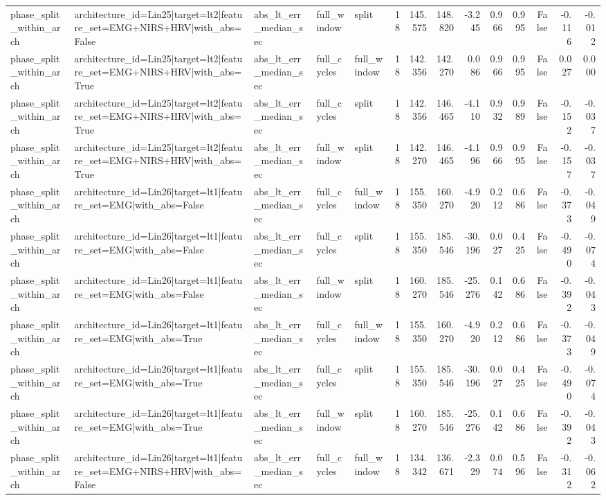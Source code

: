\begin{table}
\begin{tabular}{lllllrrrrrrrrr}
phase_split_within_arch & architecture_id=Lin25|target=lt2|feature_set=EMG+NIRS+HRV|with_abs=False & abs_lt_err_median_sec & full_window & split & 18 & 145.575 & 148.820 & -3.245 & 0.966 & 0.995 & False & -0.116 & -0.012 \\
phase_split_within_arch & architecture_id=Lin25|target=lt2|feature_set=EMG+NIRS+HRV|with_abs=True & abs_lt_err_median_sec & full_cycles & full_window & 18 & 142.356 & 142.270 & 0.086 & 0.966 & 0.995 & False & 0.027 & 0.000 \\
phase_split_within_arch & architecture_id=Lin25|target=lt2|feature_set=EMG+NIRS+HRV|with_abs=True & abs_lt_err_median_sec & full_cycles & split & 18 & 142.356 & 146.465 & -4.110 & 0.932 & 0.989 & False & -0.152 & -0.037 \\
phase_split_within_arch & architecture_id=Lin25|target=lt2|feature_set=EMG+NIRS+HRV|with_abs=True & abs_lt_err_median_sec & full_window & split & 18 & 142.270 & 146.465 & -4.196 & 0.966 & 0.995 & False & -0.157 & -0.037 \\
phase_split_within_arch & architecture_id=Lin26|target=lt1|feature_set=EMG|with_abs=False & abs_lt_err_median_sec & full_cycles & full_window & 18 & 155.350 & 160.270 & -4.920 & 0.212 & 0.686 & False & -0.373 & -0.049 \\
phase_split_within_arch & architecture_id=Lin26|target=lt1|feature_set=EMG|with_abs=False & abs_lt_err_median_sec & full_cycles & split & 18 & 155.350 & 185.546 & -30.196 & 0.027 & 0.425 & False & -0.490 & -0.074 \\
phase_split_within_arch & architecture_id=Lin26|target=lt1|feature_set=EMG|with_abs=False & abs_lt_err_median_sec & full_window & split & 18 & 160.270 & 185.546 & -25.276 & 0.142 & 0.686 & False & -0.392 & -0.043 \\
phase_split_within_arch & architecture_id=Lin26|target=lt1|feature_set=EMG|with_abs=True & abs_lt_err_median_sec & full_cycles & full_window & 18 & 155.350 & 160.270 & -4.920 & 0.212 & 0.686 & False & -0.373 & -0.049 \\
phase_split_within_arch & architecture_id=Lin26|target=lt1|feature_set=EMG|with_abs=True & abs_lt_err_median_sec & full_cycles & split & 18 & 155.350 & 185.546 & -30.196 & 0.027 & 0.425 & False & -0.490 & -0.074 \\
phase_split_within_arch & architecture_id=Lin26|target=lt1|feature_set=EMG|with_abs=True & abs_lt_err_median_sec & full_window & split & 18 & 160.270 & 185.546 & -25.276 & 0.142 & 0.686 & False & -0.392 & -0.043 \\
phase_split_within_arch & architecture_id=Lin26|target=lt1|feature_set=EMG+NIRS+HRV|with_abs=False & abs_lt_err_median_sec & full_cycles & full_window & 18 & 134.342 & 136.671 & -2.329 & 0.074 & 0.596 & False & -0.312 & -0.062 \\

\end{tabular}
\end{table}

